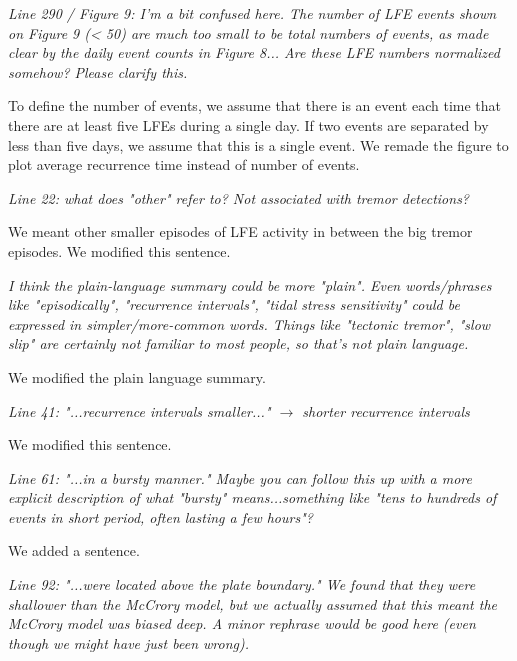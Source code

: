 \documentclass[letterpaper, 12pt]{article}
\begin{document}
\bigskip

\textit{Line 290 / Figure 9: I'm a bit confused here. The number of LFE events shown on Figure 9 (< 50) are much too small to be total numbers of events, as made clear by the daily event counts in Figure 8... Are these LFE numbers normalized somehow? Please clarify this.} 

\bigskip

To define the number of events, we assume that there is an event each time that there are at least five LFEs during a single day. If two events are separated by less than five days, we assume that this is a single event. We remade the figure to plot average recurrence time instead of number of events.

\bigskip

\textit{Line 22: what does "other" refer to? Not associated with tremor detections?}

\bigskip

We meant other smaller episodes of LFE activity in between the big tremor episodes. We modified this sentence.

\bigskip

\textit{I think the plain-language summary could be more "plain". Even words/phrases like "episodically", "recurrence intervals", "tidal stress sensitivity" could be expressed in  simpler/more-common words. Things like "tectonic tremor", "slow slip" are certainly not familiar to most people, so that's not plain language.}

\bigskip

We modified the plain language summary.

\bigskip

\textit{Line 41: "...recurrence intervals smaller..." $\rightarrow$ shorter recurrence intervals}

\bigskip

We modified this sentence.

\bigskip

\textit{Line 61: "...in a bursty manner." Maybe you can follow this up with a more explicit description of what "bursty" means...something like "tens to hundreds of events in short period, often lasting a few hours"?}

\bigskip

We added a sentence.

\bigskip

\textit{Line 92: "...were located above the plate boundary." We found that they were shallower than the McCrory model, but we actually assumed that this meant the McCrory model was biased deep. A minor rephrase would be good here (even though we might have just been wrong).}
\end{document}
